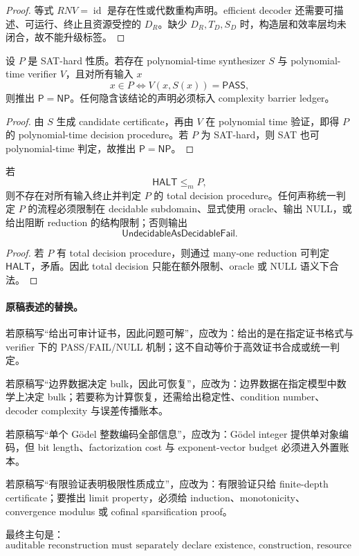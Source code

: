 \begin{proof}
等式 \(RNV=\operatorname{id}\) 是存在性或代数重构声明。efficient decoder 还需要可描述、可运行、终止且资源受控的 \(D_R\)。缺少 \(D_R,T_D,S_D\) 时，构造层和效率层均未闭合，故不能升级标签。
\end{proof}

\begin{theorem}\label{thm:typed-address-biaxial-completion-verifier-synthesis-barrier}
设 \(P\) 是 SAT-hard 性质。若存在 polynomial-time synthesizer \(S\) 与 polynomial-time verifier \(V\)，且对所有输入 \(x\)
\[
x\in P
\Longleftrightarrow
V(x,S(x))=\mathsf{PASS},
\]
则推出 \(\mathsf P=\mathsf{NP}\)。任何隐含该结论的声明必须标入 complexity barrier ledger。
\end{theorem}

\begin{proof}
由 \(S\) 生成 candidate certificate，再由 \(V\) 在 polynomial time 验证，即得 \(P\) 的 polynomial-time decision procedure。若 \(P\) 为 SAT-hard，则 SAT 也可 polynomial-time 判定，故推出 \(\mathsf P=\mathsf{NP}\)。
\end{proof}

\begin{theorem}[不可判定边界]\label{thm:typed-address-biaxial-completion-undecidability-boundary}
若
\[
\mathsf{HALT}\le_m P,
\]
则不存在对所有输入终止并判定 \(P\) 的 total decision procedure。任何声称统一判定 \(P\) 的流程必须限制在 decidable subdomain、显式使用 oracle、输出 NULL，或给出阻断 reduction 的结构限制；否则输出
\[
\boxed{
\mathsf{UndecidableAsDecidableFail}.
}
\]
\end{theorem}

\begin{proof}
若 \(P\) 有 total decision procedure，则通过 many-one reduction 可判定 \(\mathsf{HALT}\)，矛盾。因此 total decision 只能在额外限制、oracle 或 NULL 语义下合法。
\end{proof}

\paragraph{原稿表述的替换。}
若原稿写“给出可审计证书，因此问题可解”，应改为：给出的是在指定证书格式与 verifier 下的 PASS/FAIL/NULL 机制；这不自动等价于高效证书合成或统一判定。

若原稿写“边界数据决定 bulk，因此可恢复”，应改为：边界数据在指定模型中数学上决定 bulk；若要称为计算恢复，还需给出稳定性、condition number、decoder complexity 与误差传播账本。

若原稿写“单个 Gödel 整数编码全部信息”，应改为：Gödel integer 提供单对象编码，但 bit length、factorization cost 与 exponent-vector budget 必须进入外置账本。

若原稿写“有限验证表明极限性质成立”，应改为：有限验证只给 finite-depth certificate；要推出 limit property，必须给 induction、monotonicity、convergence modulus 或 cofinal sparsification proof。

最终主句是：
\[
\boxed{
\text{auditable reconstruction must separately declare existence, construction, resource bounds, certificate format, verifier semantics, NULL rules, and undecidability boundaries.}
}
\]
